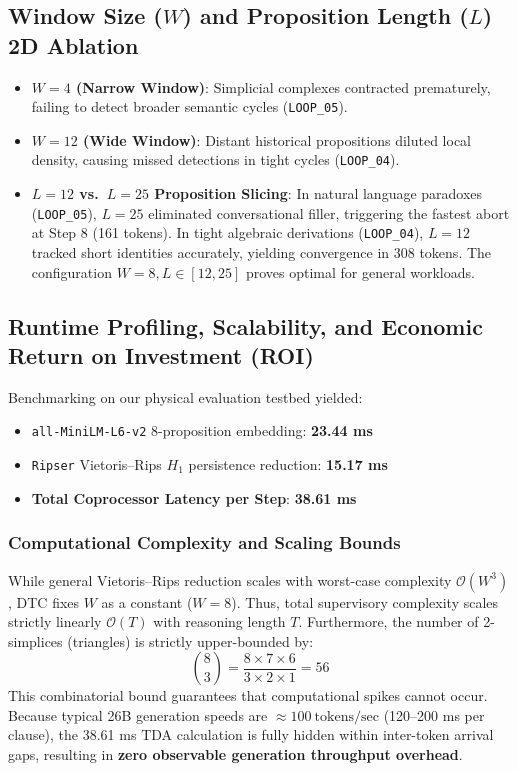 \documentclass[11pt,a4paper]{article}
\begin{document}
\subsection{Window Size ($W$) and Proposition Length ($L$) 2D Ablation}
\begin{itemize}
    \item \textbf{$W=4$ (Narrow Window)}: Simplicial complexes contracted prematurely, failing to detect broader semantic cycles (\texttt{LOOP\_05}).
    \item \textbf{$W=12$ (Wide Window)}: Distant historical propositions diluted local density, causing missed detections in tight cycles (\texttt{LOOP\_04}).
    \item \textbf{$L=12$ vs.\ $L=25$ Proposition Slicing}: In natural language paradoxes (\texttt{LOOP\_05}), $L=25$ eliminated conversational filler, triggering the fastest abort at Step 8 (161 tokens). In tight algebraic derivations (\texttt{LOOP\_04}), $L=12$ tracked short identities accurately, yielding convergence in 308 tokens. The configuration $W=8, L \in [12, 25]$ proves optimal for general workloads.
\end{itemize}

\subsection{Runtime Profiling, Scalability, and Economic Return on Investment (ROI)}
Benchmarking on our physical evaluation testbed yielded:
\begin{itemize}
    \item \texttt{all-MiniLM-L6-v2} 8-proposition embedding: \textbf{23.44 ms}
    \item \texttt{Ripser} Vietoris--Rips $H_1$ persistence reduction: \textbf{15.17 ms}
    \item \textbf{Total Coprocessor Latency per Step}: \textbf{38.61 ms}
\end{itemize}

\subsubsection{Computational Complexity and Scaling Bounds}
While general Vietoris--Rips reduction scales with worst-case complexity $\mathcal{O}(W^3)$, DTC fixes $W$ as a constant ($W=8$). Thus, total supervisory complexity scales strictly linearly $\mathcal{O}(T)$ with reasoning length $T$. Furthermore, the number of 2-simplices (triangles) is strictly upper-bounded by:
\begin{equation}
\binom{8}{3} = \frac{8 \times 7 \times 6}{3 \times 2 \times 1} = 56
\end{equation}
This combinatorial bound guarantees that computational spikes cannot occur. Because typical 26B generation speeds are $\approx 100\ \mathrm{tokens/sec}$ (120--200 ms per clause), the 38.61 ms TDA calculation is fully hidden within inter-token arrival gaps, resulting in \textbf{zero observable generation throughput overhead}.
\end{document}

